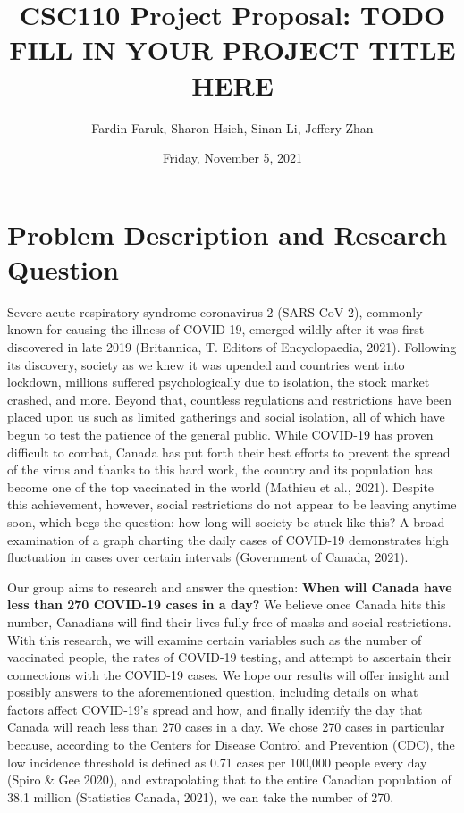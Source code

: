 \documentclass[fontsize=11pt]{article}
\title{CSC110 Project Proposal: TODO FILL IN YOUR PROJECT TITLE HERE}
\author{Fardin Faruk, Sharon Hsieh, Sinan Li, Jeffery Zhan}
\date{Friday, November 5, 2021}
\begin{document}
    \maketitle

    \section*{Problem Description and Research Question}

    Severe acute respiratory syndrome coronavirus 2 (SARS-CoV-2), commonly known for causing the illness of COVID-19, emerged wildly after it was first discovered in late 2019 (Britannica, T. Editors of Encyclopaedia, 2021). Following its discovery, society as we knew it was upended and countries went into lockdown, millions suffered psychologically due to isolation, the stock market crashed, and more. Beyond that, countless regulations and restrictions have been placed upon us such as limited gatherings and social isolation, all of which have begun to test the patience of the general public. While COVID-19 has proven difficult to combat, Canada has put forth their best efforts to prevent the spread of the virus and thanks to this hard work, the country and its population has become one of the top vaccinated in the world (Mathieu et al., 2021). Despite this achievement, however, social restrictions do not appear to be leaving anytime soon, which begs the question: how long will society be stuck like this? A broad examination of a graph charting the daily cases of COVID-19 demonstrates high fluctuation in cases over certain intervals (Government of Canada, 2021).

    Our group aims to research and answer the question: \textbf{When will Canada have less than 270 COVID-19 cases in a day?} We believe once Canada hits this number, Canadians will find their lives fully free of masks and social restrictions. With this research, we will examine certain variables such as the number of vaccinated people, the rates of COVID-19 testing, and attempt to ascertain their connections with the COVID-19 cases. We hope our results will offer insight and possibly answers to the aforementioned question, including details on what factors affect COVID-19’s spread and how, and finally identify the day that Canada will reach less than 270 cases in a day. We chose 270 cases in particular because, according to the Centers for Disease Control and Prevention (CDC), the low incidence threshold is defined as 0.71 cases per 100,000 people every day (Spiro \& Gee 2020), and extrapolating that to the entire Canadian population of 38.1 million (Statistics Canada, 2021), we can take the number of 270.
\end{document}
